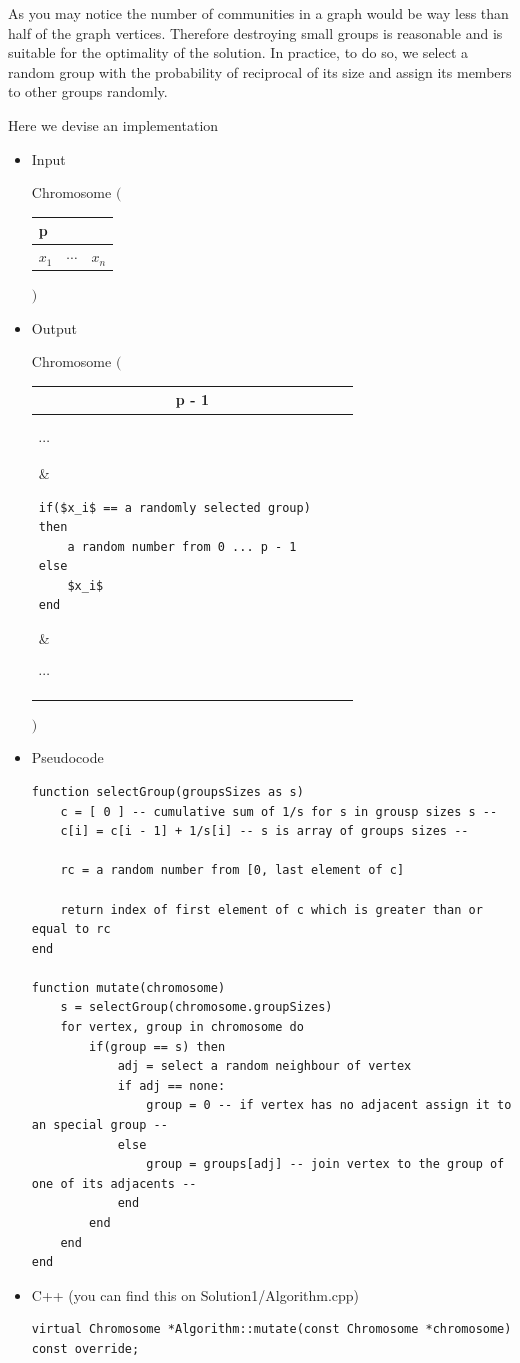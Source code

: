 \documentclass{article}
\newcommand{\textbigl}[1]{$\Bigg#1$\nobreak}
\newcommand{\textbigr}[1]{\nobreak$\Bigg#1$}
\newcommand*{\tabbox}[2][t]{
    \vspace{0pt}\parbox[#1][3.7\baselineskip]{1cm}{\strut#2\strut}
}
\begin{document}
As you may notice the number of communities in a graph would be way less than half of the graph vertices. Therefore destroying small groups is reasonable and is suitable for the optimality of the solution. In practice, to do so, we select a random group with the probability of reciprocal of its size and assign its members to other groups randomly.

\newpage
Here we devise an implementation
\begin{itemize}
\item Input

Chromosome
\textbigl(
\begin{tabular}{|c|c|c|}
\hline
\multicolumn{3}{|l|}{p} \\\hline
$x_1$ & $\cdots$ & $x_n$\\\hline
\end{tabular}
\textbigr)

\item Output

Chromosome
\textbigl(
\begin{tabular}{|C{1cm}|p{6.5cm}|C{1cm}|}
\hline
{} \\\hline
\tabbox[b]{$\cdots$} & 
\begin{lstlisting}[style=lua, mathescape=true, frame=none, breaklines=true]
if($x_i$ == a randomly selected group) 
then 
	a random number from 0 ... p - 1
else
	$x_i$
end
\end{lstlisting}
 & \tabbox[b]{$\cdots$} \\\hline
\end{tabular}
\textbigr)

\item Pseudocode
\begin{lstlisting}[style=lua]
function selectGroup(groupsSizes as s)
	c = [ 0 ] -- cumulative sum of 1/s for s in grousp sizes s --
	c[i] = c[i - 1] + 1/s[i] -- s is array of groups sizes --
	
	rc = a random number from [0, last element of c]
	
	return index of first element of c which is greater than or equal to rc
end

function mutate(chromosome)
	s = selectGroup(chromosome.groupSizes)
	for vertex, group in chromosome do
		if(group == s) then
			adj = select a random neighbour of vertex
			if adj == none:
				group = 0 -- if vertex has no adjacent assign it to an special group --
			else 
				group = groups[adj] -- join vertex to the group of one of its adjacents --
			end
		end
	end
end
\end{lstlisting}


\item C++ (you can find this on Solution1/Algorithm.cpp)
\begin{lstlisting}
virtual Chromosome *Algorithm::mutate(const Chromosome *chromosome) const override;
\end{lstlisting}

\end{itemize}
\end{document}
